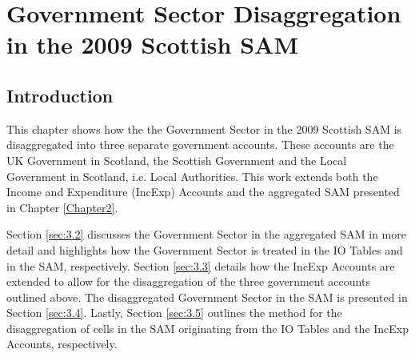 \chapter{Government Sector Disaggregation in the 2009 Scottish SAM}
\label{Chapter3}



\section{Introduction}
\label{sec:3.1}

This chapter shows how the the Government Sector in the 2009 Scottish SAM is disaggregated into three separate government accounts. These accounts are the UK Government in Scotland, the Scottish Government and the Local Government in Scotland, i.e. Local Authorities. This work extends both the Income and Expenditure (IncExp) Accounts and the aggregated SAM presented in Chapter \ref{Chapter2}. 



Section \ref{sec:3.2} discusses the Government Sector in the aggregated SAM in more detail and highlights how the Government Sector is treated in the IO Tables and in the SAM, respectively. Section \ref{sec:3.3} details how the IncExp Accounts are extended to allow for the disaggregation of the three government accounts outlined above. The disaggregated Government Sector in the SAM is presented in Section \ref{sec:3.4}. Lastly, Section \ref{sec:3.5} outlines the method for the disaggregation of cells in the SAM originating from the IO Tables and the IncExp Accounts, respectively.

